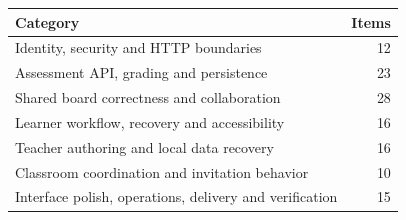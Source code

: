 \begin{tabularx}{\textwidth}{Xr}\toprule Category & Items \\\midrule
Identity, security and HTTP boundaries & 12 \\
Assessment API, grading and persistence & 23 \\
Shared board correctness and collaboration & 28 \\
Learner workflow, recovery and accessibility & 16 \\
Teacher authoring and local data recovery & 16 \\
Classroom coordination and invitation behavior & 10 \\
Interface polish, operations, delivery and verification & 15 \\\bottomrule\end{tabularx}
